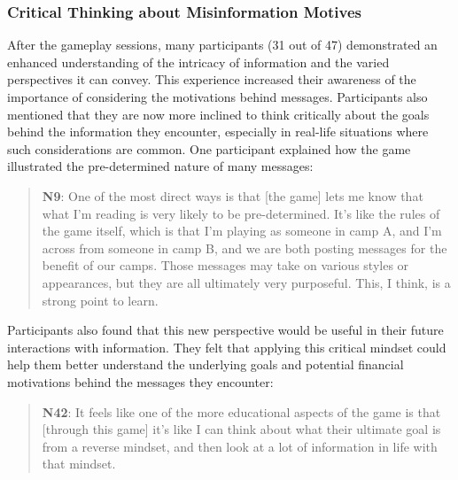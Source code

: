 \subsubsection{Critical Thinking about Misinformation Motives}
After the gameplay sessions, many participants (31 out of 47) demonstrated an enhanced understanding of the intricacy of information and the varied perspectives it can convey. This experience increased their awareness of the importance of considering the motivations behind messages. Participants also mentioned that they are now more inclined to think critically about the goals behind the information they encounter, especially in real-life situations where such considerations are common.
One participant explained how the game illustrated the pre-determined nature of many messages:
\begin{quote}
    \textbf{N9}:
    One of the most direct ways is that [the game] lets me know that what I'm reading is very likely to be pre-determined. It's like the rules of the game itself, which is that I'm playing as someone in camp A, and I'm across from someone in camp B, and we are both posting messages for the benefit of our camps. Those messages may take on various styles or appearances, but they are all ultimately very purposeful. This, I think, is a strong point to learn.
\end{quote}
Participants also found that this new perspective would be useful in their future interactions with information. They felt that applying this critical mindset could help them better understand the underlying goals and potential financial motivations behind the messages they encounter:
\begin{quote}
    \textbf{N42}:
    It feels like one of the more educational aspects of the game is that [through this game] it's like I can think about what their ultimate goal is from a reverse mindset, and then look at a lot of information in life with that mindset.
\end{quote}

